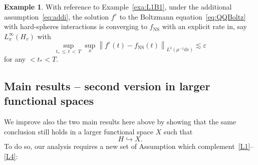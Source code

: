 \documentclass[10pt]{amsart}
\theoremstyle{definition}\newtheorem{defi}[theo]{Definition}\newtheorem{rema}[theo]{Remark}\newtheorem{exam}[theo]{Example}\newtheorem{exem}[theo]{Example}\newtheorem{nota}[theo]{Notation}
\newcommand{\ns}{\mathrm{NS}}
\renewcommand{\d}{\mathrm{d}}
\newcommand{\Ss}{H}
\newcommand{\Sl}{X}
\renewcommand*\le{\leqslant}
\newcommand*\eps{{\varepsilon}}
\begin{document}
\begin{exem}\label{exe:rate}
With reference to Example~\ref{exa:L1B1}, under the additional assumption~\eqref{eq:addi}, the solution $f^{\eps}$ to the Boltzmann equation~\eqref{eq:QQBoltz} with hard-spheres interactions is converging to $f_\ns$ with an explicit rate in, say $L^{\infty}_{x}(\Ss_{v})$ with
\[
\sup_{t_*\,\le\,t\,<\,T} \sup_{x} \left\| f^\eps(t) - f_\ns(t) \right\|_{ L^2\left(\mu^{-1}\d v\right) } \lesssim \eps
\]
for any $< t_* < T.$
\end{exem}



\subsection{Main results -- second version in larger functional spaces}

We improve also the two main results here above by showing that the same conclusion still holds in a larger functional space $\Sl$ such that
\[
\Ss \hookrightarrow \Sl.
\]
To do so, our analysis requires a new set of Assumption which complement~\eqref{L1}--\eqref{L4}:
\end{document}
